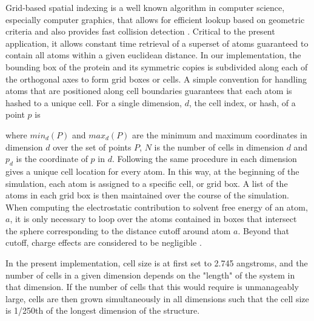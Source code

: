 Grid-based spatial indexing is a well known algorithm in computer science, especially computer graphics, that allows for efficient lookup based on geometric criteria and also provides fast collision detection \cite{bentley1979data}.
Critical to the present application, it allows constant time retrieval of a superset of atoms guaranteed to contain all atoms within a given euclidean distance.
In our implementation, the bounding box of the protein and its symmetric copies is subdivided along each of the orthogonal axes to form grid boxes or cells.
A simple convention for handling atoms that are positioned along cell boundaries guarantees that each atom is hashed to a unique cell.
For a single dimension, $d$, the cell index, or hash, of a point $p$ is 

where $min_d(P)$ and $max_d(P)$ are the minimum and maximum coordinates in dimension $d$ over the set of points $P$, $N$ is the number of cells in dimension $d$ and $p_{d}$ is the coordinate of $p$ in $d$.
Following the same procedure in each dimension gives a unique cell location for every atom.
In this way, at the beginning of the simulation, each atom is assigned to a specific cell, or grid box.
A list of the atoms in each grid box is then maintained over the course of the simulation.
When computing the electrostatic contribution to solvent free energy of an atom, $a$, it is only necessary to loop over the atoms contained in boxes that intersect the sphere corresponding to the distance cutoff around atom $a$. 
Beyond that cutoff, charge effects are considered to be negligible \cite{gallicchio2004agbnp}.

In the present implementation, cell size is at first set to 2.745 angstroms, and the number of cells in a given dimension depends on the "length" of the system in that dimension.
If the number of cells that this would require is unmanageably large, cells are then grown simultaneously in all dimensions such that the cell size is 1/250th of the longest dimension of the structure.

